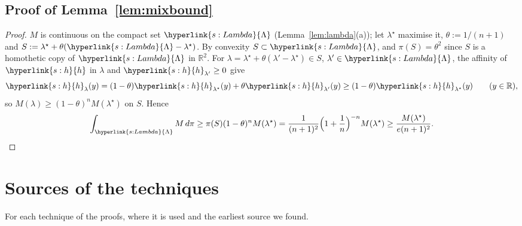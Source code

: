 \documentclass[11pt]{article}
\newcommand{\R}{\mathbb{R}}
\newcommand{\sy}[2]{{\hyperlink{#1}{#2}}}
\newcommand{\hl}{\sy{s:h}{h}}
\newcommand{\Lam}{\sy{s:Lambda}{\Lambda}}
\begin{document}
\subsection{Proof of Lemma~\ref{lem:mixbound}}\label{sec:proof-lem-mixbound}

\begin{proof}
$M$ is continuous on the compact set $\Lam$ (Lemma~\ref{lem:lambda}(a)); let $\lambda^\star$ maximise it, $\theta:=1/(n+1)$ and
$S:=\lambda^\star+\theta(\Lam-\lambda^\star)$. By convexity $S\subset\Lam$, and $\pi(S)=\theta^2$ since $S$ is a homothetic copy of $\Lam$ in
$\R^2$. For $\lambda=\lambda^\star+\theta(\lambda'-\lambda^\star)\in S$, $\lambda'\in\Lam$, the affinity of $\hl$ in $\lambda$ and $\hl_{\lambda'}\ge0$ give
\begin{equation*}
  \hl_\lambda(y)=(1-\theta)\hl_{\lambda^\star}(y)+\theta\hl_{\lambda'}(y)\ge(1-\theta)\hl_{\lambda^\star}(y)\qquad(y\in\R),
\end{equation*}
so $M(\lambda)\ge(1-\theta)^nM(\lambda^\star)$ on $S$. Hence
\begin{equation*}
  \int_\Lam M\,d\pi\ge\pi(S)(1-\theta)^nM(\lambda^\star)=\frac1{(n+1)^2}\Bigl(1+\frac1n\Bigr)^{-n}M(\lambda^\star)\ge\frac{M(\lambda^\star)}{e(n+1)^2}.
\end{equation*}
\end{proof}

\section{Sources of the techniques}\label{sec:attribution}

For each technique of the proofs, where it is used and the earliest source we found.
\end{document}
